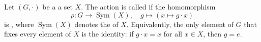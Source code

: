 \begin{definition} \label{definition:faithful_action_of_a_group_on_a_set}
Let $(G,\cdot)$ be a   a set $X$. The action is called  if the homomorphism
$$\rho : G \to \operatorname{Sym}(X), \quad g \mapsto (x \mapsto g \cdot x)$$
is , where $\operatorname{Sym}(X)$ denotes the  of $X$. Equivalently, the only element of $G$ that fixes every element of $X$ is the identity: if $g \cdot x = x$ for all $x \in X$, then $g = e$.
\end{definition}
